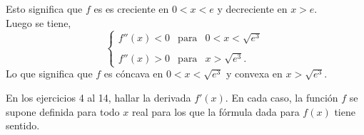\begin{enumerate}[\bfseries 1.]
	Esto significa que $f$ es es creciente en $0<x<e$ y decreciente en $x>e$.\\
	
	Luego se tiene, 
	$$
	\left\{
	\begin{array}{rcl}
	    f''(x)<0 &\mbox{para} & 0<x<\sqrt{e^3}\\\\
	    f''(x)>0 &\mbox{para} & x>\sqrt{e^3}.
	\end{array}
	\right.
	$$
	Lo que significa que $f$ es cóncava en $0<x<\sqrt{e^3}$ y convexa en $x>\sqrt{e^3}$.
	\begin{center}
	\end{center}
	\vspace{.5cm}

    \end{enumerate}

    En los ejercicios 4 al 14, hallar la derivada $f'(x)$. En cada caso, la función $f$ se supone definida para todo $x$ real para los que la fórmula dada para $f(x)$ tiene sentido.\\

